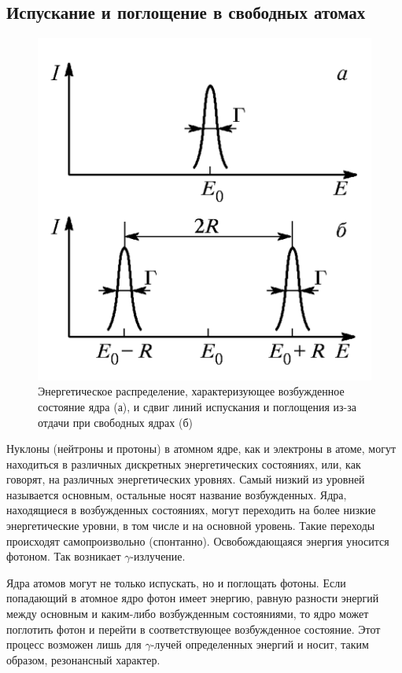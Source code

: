 \documentclass[12pt]{kiarticle}
\begin{document}
	\subsection{Испускание и поглощение в свободных атомах}
	
	\begin{figure}
		\includegraphics[width=\linewidth]{G}
		\caption{Энергетическое распределение, характеризующее возбужденное состояние ядра (а),
			и сдвиг линий испускания и поглощения из-за отдачи при свободных ядрах (б)}
		\label{ris 1}
	\end{figure}
	
	Нуклоны (нейтроны и протоны) в атомном ядре, как и электроны
	в атоме, могут находиться в различных дискретных энергетических
	состояниях, или, как говорят, на различных энергетических уровнях.
	Самый низкий из уровней называется основным, остальные носят название возбужденных. Ядра, находящиеся в возбужденных состояниях, могут переходить на более низкие энергетические уровни, в том
	числе и на основной уровень. Такие переходы происходят самопроизвольно (спонтанно). Освобождающаяся энергия уносится фотоном.
	Так возникает $ \gamma $-излучение.
	
	Ядра атомов могут не только испускать, но и поглощать фотоны. Если попадающий в атомное ядро фотон имеет
	энергию, равную разности энергий между основным и каким-либо возбужденным состояниями, то ядро может поглотить фотон и перейти в соответствующее возбужденное состояние. Этот процесс возможен лишь для $ \gamma $-лучей определенных энергий и носит, таким образом, резонансный характер.
	
\end{document}
